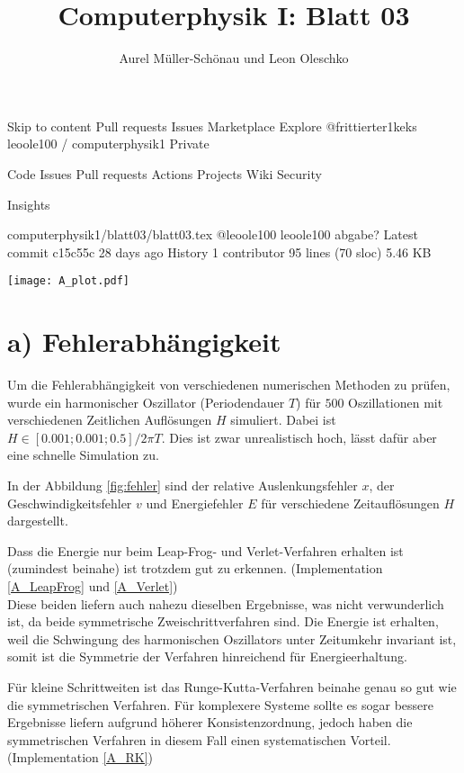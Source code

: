 
Skip to content
Pull requests
Issues
Marketplace
Explore
@frittierter1keks
leoole100 /
computerphysik1
Private

Code
Issues
Pull requests
Actions
Projects
Wiki
Security

    Insights

computerphysik1/blatt03/blatt03.tex
@leoole100
leoole100 abgabe?
Latest commit c15c55c 28 days ago
History
1 contributor
95 lines (70 sloc) 5.46 KB





\title{Computerphysik I: Blatt 03}
\author{Aurel Müller-Schönau und Leon Oleschko}
\maketitle

\begin{figure*}[h!]
	\centering
	\texttt{[image: A\_plot.pdf]}
	\caption{Fehler in Abhängigkeit von der Schrittweite $H$}
	\label{fig:fehler}
\end{figure*}


\section*{a) Fehlerabhängigkeit}
Um die Fehlerabhängigkeit von verschiedenen numerischen Methoden zu prüfen, wurde ein harmonischer Oszillator (Periodendauer $T$) für $500$ Oszillationen mit verschiedenen Zeitlichen Auflösungen $H$ simuliert. Dabei ist $H\in[0.001;0.001;0.5]/2\pi T$. 
Dies ist zwar unrealistisch hoch, lässt dafür aber eine schnelle Simulation zu.

In der Abbildung \ref{fig:fehler} sind der relative Auslenkungsfehler $x$, der Geschwindigkeitsfehler $v$ und Energiefehler $E$ für verschiedene Zeitauflösungen $H$ dargestellt.

Dass die Energie nur beim Leap-Frog- und Verlet-Verfahren erhalten ist (zumindest beinahe) ist trotzdem gut zu erkennen. (Implementation \ref{A_LeapFrog} und \ref{A_Verlet})\\
Diese beiden liefern auch nahezu dieselben Ergebnisse, was nicht verwunderlich ist, da beide symmetrische Zweischrittverfahren sind. Die Energie ist erhalten, weil die Schwingung des harmonischen Oszillators unter Zeitumkehr invariant ist, somit ist die Symmetrie der Verfahren hinreichend für Energieerhaltung.

Für kleine Schrittweiten ist das Runge-Kutta-Verfahren beinahe genau so gut wie die symmetrischen Verfahren. Für komplexere Systeme sollte es sogar bessere Ergebnisse liefern aufgrund höherer Konsistenzordnung, jedoch haben die symmetrischen Verfahren in diesem Fall einen systematischen Vorteil. (Implementation \ref{A_RK})

